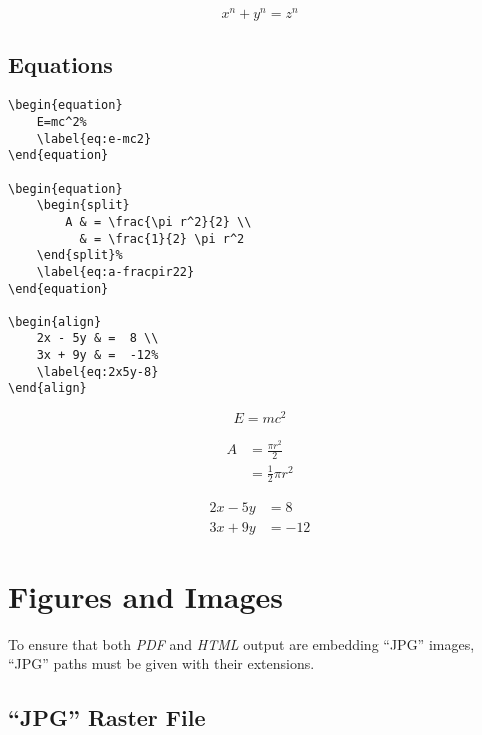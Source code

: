 \[x^n + y^n = z^n\]

\subsection*{Equations}%
\label{subsec:equations}

\begin{lstlisting}[caption={Equations.}]
\begin{equation}
    E=mc^2%
    \label{eq:e-mc2}
\end{equation}

\begin{equation}
    \begin{split}
        A & = \frac{\pi r^2}{2} \\
          & = \frac{1}{2} \pi r^2
    \end{split}%
    \label{eq:a-fracpir22}
\end{equation}

\begin{align}
    2x - 5y & =  8 \\
    3x + 9y & =  -12%
    \label{eq:2x5y-8}
\end{align}
\end{lstlisting}

\begin{equation}
    E=mc^2%
    \label{eq:e-mc2}
\end{equation}

\begin{equation}
    \begin{split}
        A & = \frac{\pi r^2}{2} \\
          & = \frac{1}{2} \pi r^2
    \end{split}%
    \label{eq:a-fracpir22}
\end{equation}

\begin{align}
    2x - 5y & =  8 \\
    3x + 9y & =  -12%
    \label{eq:2x5y-8}
\end{align}

\section*{Figures and Images}%
\label{sec:figures-and-images}

To ensure that both \textit{PDF} and \textit{HTML} output are embedding ``JPG'' images, ``JPG'' paths must be given with their extensions.

\subsection*{``JPG'' Raster File}%
\label{subsec:jpg-raster-file}

